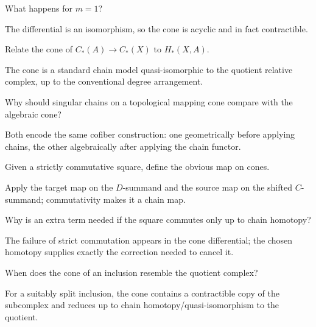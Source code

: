\begin{problem}[Case \(m=1\)]\label{prob:viii24-09}
What happens for \(m=1\)?
\end{problem}
\begin{solution}
The differential is an isomorphism, so the cone is acyclic and in fact contractible.
\end{solution}

\begin{problem}\label{prob:viii24-10}
Relate the cone of \(C_*(A)\to C_*(X)\) to \(H_*(X,A)\).
\end{problem}
\begin{solution}
The cone is a standard chain model quasi-isomorphic to the quotient relative complex, up to the conventional degree arrangement.
\end{solution}

\begin{problem}\label{prob:viii24-11}
Why should singular chains on a topological mapping cone compare with the algebraic cone?
\end{problem}
\begin{solution}
Both encode the same cofiber construction: one geometrically before applying chains, the other algebraically after applying the chain functor.
\end{solution}

\begin{problem}\label{prob:viii24-12}
Given a strictly commutative square, define the obvious map on cones.
\end{problem}
\begin{solution}
Apply the target map on the \(D\)-summand and the source map on the shifted \(C\)-summand; commutativity makes it a chain map.
\end{solution}

\begin{problem}\label{prob:viii24-13}
Why is an extra term needed if the square commutes only up to chain homotopy?
\end{problem}
\begin{solution}
The failure of strict commutation appears in the cone differential; the chosen homotopy supplies exactly the correction needed to cancel it.
\end{solution}

\begin{problem}\label{prob:viii24-14}
When does the cone of an inclusion resemble the quotient complex?
\end{problem}
\begin{solution}
For a suitably split inclusion, the cone contains a contractible copy of the subcomplex and reduces up to chain homotopy/quasi-isomorphism to the quotient.
\end{solution}

